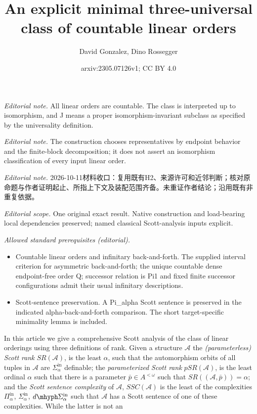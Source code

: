 \documentclass[10pt,a4paper]{amsart}
\title{An explicit minimal three-universal class of countable linear orders}
\author{David Gonzalez, Dino Rossegger}
\date{arxiv:2305.07126v1; CC BY 4.0}
\providecommand{\A}{\mathcal{A}}
\providecommand{\Pinf}[1]{\Pi^{\mathrm{in}}_{#1}}
\providecommand{\Sinf}[1]{\Sigma^{\mathrm{in}}_{#1}}
\providecommand{\dSinf}[1]{d\mhyph\Sigma^{\mathrm{in}}_{#1}}
\providecommand{\bp}{\bar p}
\newcommand{\SR}{SR}
\newcommand{\pSR}{pSR}
\begin{document}
\maketitle
\noindent\textit{Editorial note.} All linear orders are countable. The class is interpreted up to isomorphism, and J means a proper isomorphism-invariant subclass as specified by the universality definition.\par\medskip
\noindent\textit{Editorial note.} The construction chooses representatives by endpoint behavior and the finite-block decomposition; it does not assert an isomorphism classification of every input linear order.\par\medskip
\noindent\textit{Editorial note.} 2026-10-11材料收口：复用既有H2、来源许可和近邻判断；核对原命题与作者证明起止、所指上下文及装配范围齐备。未重证作者结论；沿用既有非重复依据。\par\medskip
\noindent\textit{Editorial scope.} One original exact result. Native construction and load-bearing local dependencies preserved; named classical Scott-analysis inputs explicit.\par\medskip
\noindent\textit{Allowed standard prerequisites (editorial).}\begin{itemize}
\item Countable linear orders and infinitary back-and-forth. The supplied interval criterion for asymmetric back-and-forth; the unique countable dense endpoint-free order Q; successor relation is Pi1 and fixed finite successor configurations admit their usual infinitary descriptions.
\item Scott-sentence preservation. A Pi\_alpha Scott sentence is preserved in the indicated alpha-back-and-forth comparison. The short target-specific minimality lemma is included.
\end{itemize}\medskip
In this article we give a comprehensive Scott analysis of the class of linear
orderings using three definitions of rank. Given a structure $\A$ the
\emph{(parameterless) Scott rank} $\SR(\A)$, is the least $\alpha$, such that
the automorphism orbits of all tuples in $\A$ are $\Sinf{\alpha}$ definable; the
\emph{parameterized Scott rank} $\pSR(\A)$, is the least ordinal $\alpha$ such
that there is a parameter $\bp\in A^{<\omega}$ such that $SR((\A,\bp))=\alpha$;
and the \emph{Scott sentence complexity} of $\A$, $SSC(\A)$ is the least of the
complexities $\Pinf{\alpha}$, $\Sinf{\alpha}$, $\dSinf{\alpha}$ such that $\A$
has a Scott sentence of one of these complexities. While the latter is not an
\end{document}
